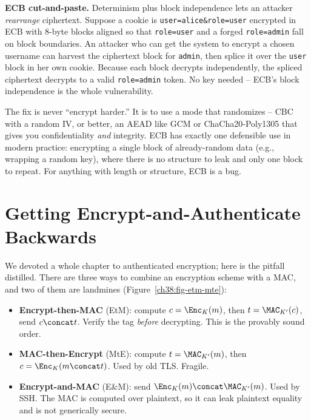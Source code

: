 \begin{attackbox}
\textbf{ECB cut-and-paste.} Determinism plus block independence lets an attacker \emph{rearrange} ciphertext. Suppose a cookie is \texttt{user=alice\&role=user} encrypted in ECB with 8-byte blocks aligned so that \texttt{role=user} and a forged \texttt{role=admin} fall on block boundaries. An attacker who can get the system to encrypt a chosen username can harvest the ciphertext block for \texttt{admin}, then splice it over the \texttt{user} block in her own cookie. Because each block decrypts independently, the spliced ciphertext decrypts to a valid \texttt{role=admin} token. No key needed -- ECB's block independence is the whole vulnerability.
\end{attackbox}

\begin{focusbox}
The fix is never ``encrypt harder.'' It is to use a mode that randomizes -- CBC with a random IV, or better, an AEAD like GCM or ChaCha20-Poly1305 that gives you confidentiality \emph{and} integrity. ECB has exactly one defensible use in modern practice: encrypting a single block of already-random data (e.g., wrapping a random key), where there is no structure to leak and only one block to repeat. For anything with length or structure, ECB is a bug.
\end{focusbox}

\section{Getting Encrypt-and-Authenticate Backwards}
\label{ch38:mac-then-encrypt}

We devoted a whole chapter to authenticated encryption; here is the pitfall distilled. There are three ways to combine an encryption scheme with a MAC, and two of them are landmines (Figure~\ref{ch38:fig-etm-mte}):

\begin{itemize}
\item \textbf{Encrypt-then-MAC} (EtM): compute $c = \Enc_K(m)$, then $t = \MAC_{K'}(c)$, send $c \concat t$. Verify the tag \emph{before} decrypting. This is the provably sound order.
\item \textbf{MAC-then-Encrypt} (MtE): compute $t = \MAC_{K'}(m)$, then $c = \Enc_K(m \concat t)$. Used by old TLS. Fragile.
\item \textbf{Encrypt-and-MAC} (E\&M): send $\Enc_K(m) \concat \MAC_{K'}(m)$. Used by SSH. The MAC is computed over plaintext, so it can leak plaintext equality and is not generically secure.
\end{itemize}

